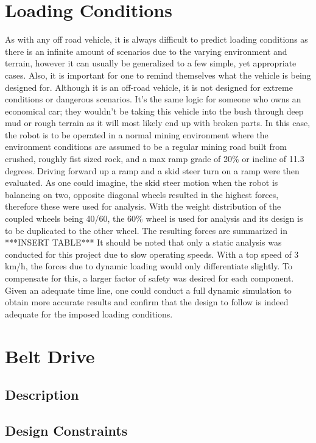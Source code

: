 \section{Loading Conditions}
As with any off road vehicle, it is always difficult to predict loading conditions as there is an infinite amount of scenarios due to the varying environment and terrain, however it can usually be generalized to a few simple, yet appropriate cases. Also, it is important for one to remind themselves what the vehicle is being designed for. Although it is an off-road vehicle, it is not designed for extreme conditions or dangerous scenarios. It's the same logic for someone who owns an economical car; they wouldn't be taking this vehicle into the bush through deep mud or rough terrain as it will most likely end up with broken parts. In this case, the robot is to be operated in a normal mining environment where the environment conditions are assumed to be a regular mining road built from crushed, roughly fist sized rock, and a max ramp grade of 20\% or incline of 11.3 degrees. Driving forward up a ramp and a skid steer turn on a ramp were then evaluated. As one could imagine, the skid steer motion when the robot is balancing on two, opposite diagonal wheels resulted in the highest forces, therefore these were used for analysis. With the weight distribution of the coupled wheels being 40/60, the 60\% wheel is used for analysis and its design is to be duplicated to the other wheel. The resulting forces are summarized in     
\line
 ***INSERT TABLE***
\line
It should be noted that only a static analysis was conducted for this project due to slow operating speeds. With a top speed of 3 km/h, the forces due to dynamic loading would only differentiate slightly. To compensate for this, a larger factor of safety was desired for each component. Given an adequate time line, one could conduct a full dynamic simulation to obtain more accurate results and confirm that the design to follow is indeed adequate for the imposed loading conditions. 

\section{Belt Drive}
\subsection{Description}
\subsection{Design Constraints}
